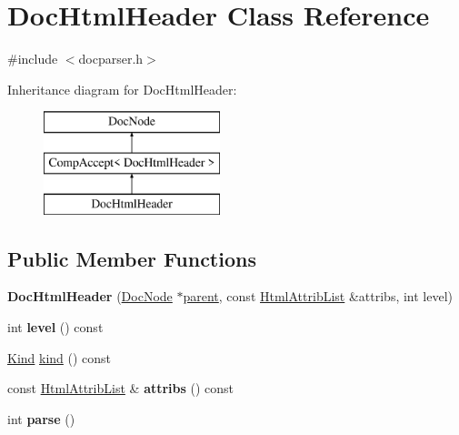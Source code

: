 \hypertarget{class_doc_html_header}{}\section{Doc\+Html\+Header Class Reference}
\label{class_doc_html_header}


{\ttfamily \#include $<$docparser.\+h$>$}

Inheritance diagram for Doc\+Html\+Header\+:\begin{figure}[H]
\begin{center}
\leavevmode
\includegraphics[height=3.000000cm]{class_doc_html_header}
\end{center}
\end{figure}
\subsection*{Public Member Functions}
\begin{DoxyCompactItemize}
\item 
\mbox{\label{class_doc_html_header_ad2f8ab500ca062906991a8f5e9a41348}} 
{\bfseries Doc\+Html\+Header} (\mbox{\hyperlink{class_doc_node}{Doc\+Node}} $\ast$\mbox{\hyperlink{class_doc_node_a73e8ad29a91cfceb0968eb00db71a23d}{parent}}, const \mbox{\hyperlink{class_html_attrib_list}{Html\+Attrib\+List}} \&attribs, int level)
\item 
\mbox{\label{class_doc_html_header_af8e82a4c504c1d6acd6838fa21404263}} 
int {\bfseries level} () const
\item 
\mbox{\hyperlink{class_doc_node_aebd16e89ca590d84cbd40543ea5faadb}{Kind}} \mbox{\hyperlink{class_doc_html_header_adffa74b5ca39ae94f0a7c1d13cf57f25}{kind}} () const
\item 
\mbox{\label{class_doc_html_header_af5cdf04109d1a52ac1ced47f81f26ab2}} 
const \mbox{\hyperlink{class_html_attrib_list}{Html\+Attrib\+List}} \& {\bfseries attribs} () const
\item 
\mbox{\label{class_doc_html_header_a36873fbacdfe8c26550845b8d79f7dbc}} 
int {\bfseries parse} ()
\end{DoxyCompactItemize}
